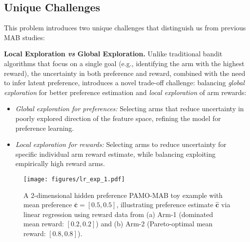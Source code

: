 


\subsection{Unique Challenges}
\label{sec:uniq_chllenge}
This problem introduces two unique challenges that distinguish us from previous MAB studies:

\textbf{Local Exploration \emph{vs} Global Exploration.}
Unlike traditional bandit algorithms that focus on a single goal (e.g., identifying the arm with the highest reward), the uncertainty in both preference and reward, combined with the need to infer latent preference, introduces a novel trade-off challenge: balancing \emph{global exploration} for better preference estimation and \emph{local exploration} of arm rewards:
\begin{itemize}[leftmargin=*]
\item \emph{Global exploration for preferences:}
Selecting arms that reduce uncertainty in poorly explored direction of the feature space, refining the model for preference learning.
\item \emph{Local exploration for rewards:}
Selecting arms to reduce uncertainty for specific individual arm reward estimate,  while balancing exploiting empirically high reward arms.
\end{itemize}


\begin{figure}[t]
\begin{center}
\centerline{\texttt{[image: figures/lr\_exp\_1.pdf]}}
\end{center}
\vskip -0.1in
\caption{A 2-dimensional hidden preference PAMO-MAB toy example with mean preference $\overline{\boldsymbol{c}} = [0.5, 0.5]$, illustrating preference estimate $\hat{\boldsymbol{c}}$ via linear regression using reward data from (a) Arm-1 (dominated mean reward: $[0.2,0.2]$) and (b) Arm-2 (Pareto-optimal mean reward: $[0.8,0.8]$).
}
\label{fig: lr_1}
\end{figure}

